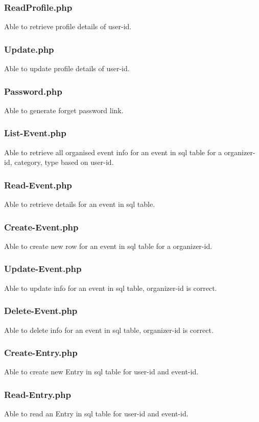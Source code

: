 \documentclass{article}
\begin{document}
\subsubsection{ReadProfile.php}
Able to retrieve profile details of user-id.
\subsubsection{Update.php}
Able to update profile details of user-id.
\subsubsection{Password.php}
Able to generate forget password link.
\subsubsection{List-Event.php}
Able to retrieve all organised event info for an event in sql table for a organizer-id, category, type based on user-id.

\subsubsection{Read-Event.php}
Able to retrieve details for an event in sql table.
\subsubsection{Create-Event.php}
Able to create new row for an event in sql table for a organizer-id.
\subsubsection{Update-Event.php}
Able to update info for an event in sql table, organizer-id is correct.
\subsubsection{Delete-Event.php}
Able to delete info for an event in sql table, organizer-id is correct.

\subsubsection{Create-Entry.php}
Able to create new Entry in sql table for user-id and event-id.
\subsubsection{Read-Entry.php}
Able to read an Entry in sql table for user-id and event-id.
\end{document}
